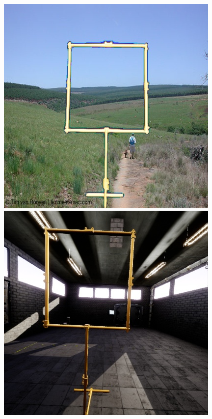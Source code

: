 \begin{figure}[hbtp]
	\centering
	\begin{minipage}{0.3\textwidth}
		\includegraphics[width=\textwidth]{fig/voc}
	\end{minipage}
	\begin{minipage}{0.3\textwidth}
		\includegraphics[width=\textwidth]{fig/sim}

\end{minipage}
\end{figure}
